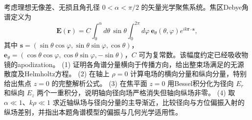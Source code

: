考虑理想无像差、无损且角孔径 \(0<\alpha<\pi/2\) 的矢量光学聚焦系统。焦区Debye角谱定义为
\[
\boldsymbol E(\boldsymbol r)=C\int_0^\alpha\!d\theta\,\sin\theta
\int_0^{2\pi}\!d\varphi\ \boldsymbol e_\theta(\theta,\varphi)
e^{ik\boldsymbol r\cdot\boldsymbol s},
\]
其中 \(\boldsymbol s=(\sin\theta\cos\varphi,\sin\theta\sin\varphi,\cos\theta)\)，
\(\boldsymbol e_\theta=(\cos\theta\cos\varphi,\cos\theta\sin\varphi,-\sin\theta)\)，\(C\) 可为复常数。该幅度约定已经吸收物镜的apodization。
(1) 证明各角谱分量横向于传播方向，给出整束场满足的无源散度及Helmholtz方程。
(2) 在轴上 \(\rho=0\) 计算电场的横向分量和纵向分量，特别给出焦点 \(z=0\) 的完整解析公式。
(3) 在焦平面 \(z=0\) 用Bessel积分化为径向 \(E_r\) 和纵向 \(E_z\) 两个一重积分，说明轴向径向场严格消失但轴向纵场非零。
(4) 取 \(\alpha\ll1\)、\(k\rho\ll1\) 求近轴纵场与径向分量的主导渐近，比较径向与方位偏振入射的纵场差别，并指出本题角谱模型的偏振与几何光学适用性。
